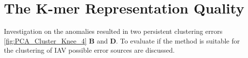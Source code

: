 \section{The K-mer Representation Quality} \label{sec:K_mer_Representation}

Investigation on the anomalies resulted in two persistent clustering errors \autoref{fig:PCA_Cluster_Knee_4} \textbf{\textsf{B}} and \textbf{\textsf{D}}. To evaluate if the method is suitable for the clustering of \gls{IAV} possible error sources are discussed.




